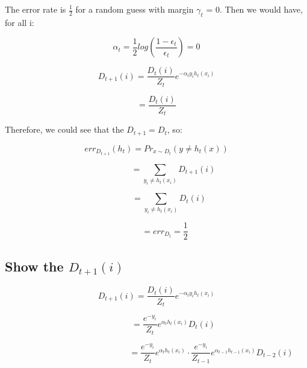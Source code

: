 \documentclass{article} %
\begin{document}
The error rate is $\frac{1}{2}$ for a random guess with margin $\gamma_t$ = 0.
Then we would have, for all i:

\begin{equation}
\alpha_t = \frac{1}{2} log (\frac{1 - \epsilon_t}{\epsilon_t}) = 0
\end{equation}

\begin{equation}
D_{t+1} (i) = \frac{D_t (i)}{Z_t} e^{ -\alpha_t y_i h_t (x_i) }
\end{equation}

\begin{equation}
= \frac{D_t (i)}{Z_t}
\end{equation}

Therefore, we could see that the $D_{t+1} = D_t$, so:

\begin{equation}
err_{D_{t+1}} (h_t)= Pr_{x \sim D_t} (y \neq h_t (x))
\end{equation}

\begin{equation}
\qquad \qquad
= \sum_{y_i \neq h_t (x_i)} D_{t+1} (i)
\end{equation}

\begin{equation}
\qquad \quad
= \sum_{y_i \neq h_t (x_i)} D_t (i)
\end{equation}

\begin{equation}
\qquad
= err_{D_t} = \frac{1}{2}
\end{equation}


\subsection{Show the $D_{t+1} (i)$}
\begin{equation}
D_{t+1} (i) = \frac{D_t (i)}{Z_t} e^{ -\alpha_t y_i h_t (x_i) }
\end{equation}

\begin{equation}
\quad \qquad \quad
= \frac{e^{-y_i}}{Z_t} e^{\alpha_t h_t (x_i)} D_t (i)
\end{equation}

\begin{equation}
\qquad \qquad \qquad \qquad \qquad \qquad \quad
= \frac{e^{-y_i}}{Z_t} e^{\alpha_t h_t (x_i)} \cdot
\frac{e^{-y_i}}{Z_{t-1}} e^{\alpha_{t-1} h_{t-1} (x_i)} D_{t-2} (i)
\end{equation}
\end{document}
